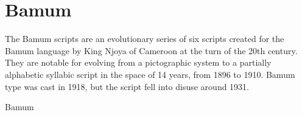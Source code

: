 \section{Bamum}
\label{s:bamum
}
The Bamum scripts are an evolutionary series of six scripts created for the Bamum language by King Njoya of Cameroon at the turn of the 20th century. They are notable for evolving from a pictographic system to a partially alphabetic syllabic script in the space of 14 years, from 1896 to 1910. Bamum type was cast in 1918, but the script fell into disuse around 1931.

\newfontfamily{}

\begin{scriptexample}[]{Bamum}
\end{scriptexample}
